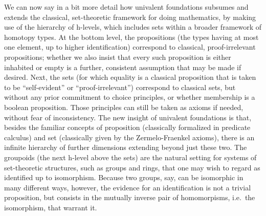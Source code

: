 \documentclass[11pt]{article}
\theoremstyle{remark}
\theoremstyle{definition}
\begin{document}
We can now say in a bit more detail how univalent foundations subsumes and extends the classical, set-theoretic framework for doing
mathematics, by making use of the hierarchy of h-levels, which includes sets within a broader framework of homotopy types.  
At the bottom level, the propositions (the types having at most one element, up to higher identification)
correspond to classical, proof-irrelevant propositions; whether we also insist that every such proposition is either inhabited
or empty is a further, consistent assumption that may be made if desired.  
Next, the sets (for which equality is a
classical proposition that is taken to be ``self-evident'' or ``proof-irrelevant'') correspond to classical
sets, but without any prior commitment to choice principles, or whether membership is a boolean proposition.  
Those principles can still be taken as axioms if needed, without fear of inconsistency.  
The new insight of univalent foundations is that, besides the familiar concepts of proposition (classically formalized in predicate calculus) 
and set (classically given by the Zermelo-Fraenkel axioms), there is an infinite hierarchy of further dimensions extending beyond just these two.  The groupoids (the next h-level above the sets) are the natural setting for systems of set-theoretic structures, such as groups and rings, that one may wish to regard as identified up to isomorphism.  Because two groups, say, can be isomorphic in many different ways, however, the evidence for an identification is not a trivial proposition, but consists in the mutually inverse pair of homomorpisms, i.e.\ the isomorphism, that warrant it.
\end{document}
